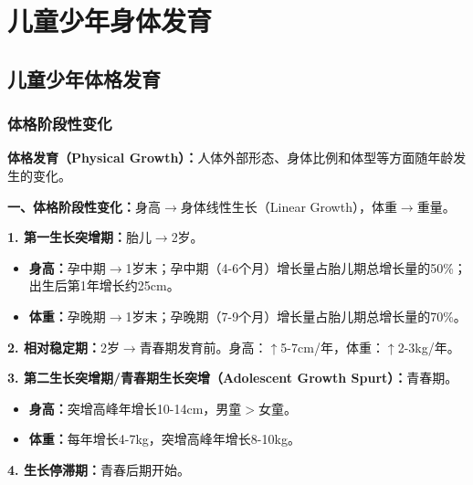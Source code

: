 \chapter{儿童少年身体发育}
\setcounter{chapter}{3}

\section{儿童少年体格发育}

\subsection{体格阶段性变化}

\begin{keybox}
\textbf{体格发育（Physical Growth）：}人体外部形态、身体比例和体型等方面随年龄发生的变化。

\textbf{一、体格阶段性变化：}身高$\to$身体线性生长（Linear Growth），体重$\to$重量。

\textbf{1. 第一生长突增期：}胎儿$\to$2岁。
\begin{itemize}[leftmargin=*]
    \item \textbf{身高：}孕中期$\to$1岁末；孕中期（4-6个月）增长量占胎儿期总增长量的50\%；出生后第1年增长约25cm。
    \item \textbf{体重：}孕晚期$\to$1岁末；孕晚期（7-9个月）增长量占胎儿期总增长量的70\%。
\end{itemize}

\textbf{2. 相对稳定期：}2岁$\to$青春期发育前。身高：$\uparrow$5-7cm/年，体重：$\uparrow$2-3kg/年。

\textbf{3. 第二生长突增期/青春期生长突增（Adolescent Growth Spurt）：}青春期。
\begin{itemize}[leftmargin=*]
    \item \textbf{身高：}突增高峰年增长10-14cm，男童$>$女童。
    \item \textbf{体重：}每年增长4-7kg，突增高峰年增长8-10kg。
\end{itemize}

\textbf{4. 生长停滞期：}青春后期开始。
\end{keybox}

